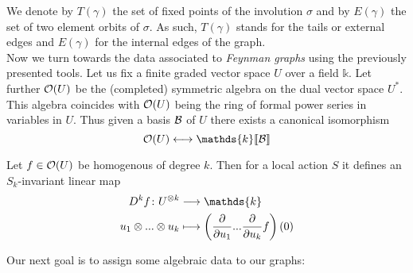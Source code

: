 We denote by $T(\gamma)$ the set of fixed points of the involution $\sigma$ and by $E(\gamma)$ the set of two element orbits of $\sigma$. As such, $T(\gamma)$ stands for the tails or external edges and $E(\gamma)$ for the internal edges of the graph.\\

Now we turn towards the data associated to \emph{Feynman graphs} using the previously presented tools. Let us fix a finite graded vector space $U$ over a field $\mathds{k}$. Let further $\mathcal{O}(U)$ be the (completed) symmetric algebra on the dual vector space $U^*$. This algebra coincides with $\mathcal{O}(U)$ being the ring of formal power series in variables in $U$. Thus given a basis $\mathcal{B}$ of $U$ there exists a canonical isomorphism
\begin{equation} \OO(U) \longleftrightarrow \mathds{k}\llbracket\BB\rrbracket\end{equation}

\begin{definition}
  Let $f \in \mathcal{O}(U)$ be homogenous of degree $k$. Then for a local action $S$ it defines an $S_k$-invariant linear map
  \begin{align}
    D^kf \colon U^{\otimes k} &\lra \mathds{k}\\
    u_1 \otimes ... \otimes u_k &\lmap \left( \dell{}{u_1} ... \dell{}{u_k} f \right) (0)
  \end{align}
\end{definition}

Our next goal is to assign some algebraic data to our graphs:

